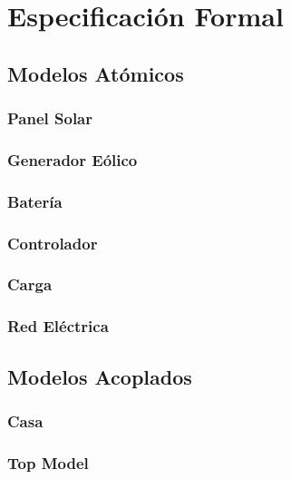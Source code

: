 \section{Especificación Formal}

\subsection{Modelos Atómicos}

\subsubsection{Panel Solar}
\subsubsection{Generador Eólico}
\subsubsection{Batería}
\subsubsection{Controlador}
\subsubsection{Carga}
\subsubsection{Red Eléctrica}

\subsection{Modelos Acoplados}

\subsubsection{Casa}
\subsubsection{Top Model}
